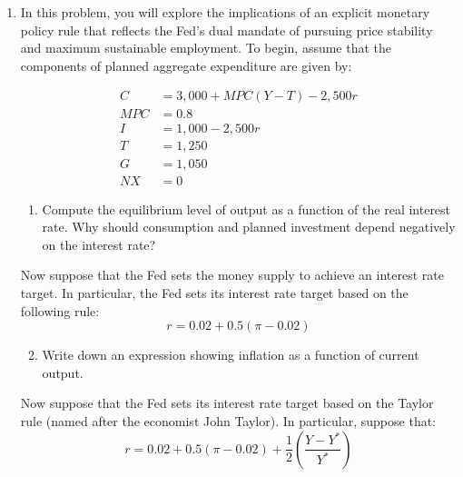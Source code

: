\documentclass{article}
\begin{document}
\begin{enumerate}
\begin{enumerate}
	\item Now suppose that the government wants to use fiscal policy to restore the economy to potential output. By how much would the government need to change the tax rate in order to accomplish this objective?
	
	\item Show each of the changes in parts (b), (c), and (d) on a single, carefully labeled AD-AS diagram.
	
	\end{enumerate}
	
\item In this problem, you will explore the implications of an explicit monetary policy rule that reflects the Fed's dual mandate of pursuing price stability and maximum sustainable employment. To begin, assume that the components of planned aggregate expenditure are given by:

	\begin{align*}
	C &= 3,000 + MPC(Y - T) - 2,500r \\
	MPC &= 0.8 \\
	I &= 1,000 - 2,500r \\
	T &= 1,250 \\
	G &= 1,050 \\
	NX &= 0
	\end{align*}
	
	\begin{enumerate}
	
	\item Compute the equilibrium level of output as a function of the real interest rate. Why should consumption and planned investment depend negatively on the interest rate?
	
	\end{enumerate}
	
	Now suppose that the Fed sets the money supply to achieve an interest rate target. In particular, the Fed sets its interest rate target based on the following rule: \[r = 0.02 + 0.5(\pi - 0.02) \]
	
	\begin{enumerate}
	
	\setcounter{enumii}{1}
	\item Write down an expression showing inflation as a function of current output.
	
	\end{enumerate}
	
	Now suppose that the Fed sets its interest rate target based on the Taylor rule (named after the economist John Taylor). In particular, suppose that: \[r = 0.02 + 0.5(\pi - 0.02) + \frac{1}{2} \left( \frac{Y - Y^*}{Y^*} \right) \]
	

\end{enumerate}
\end{document}
